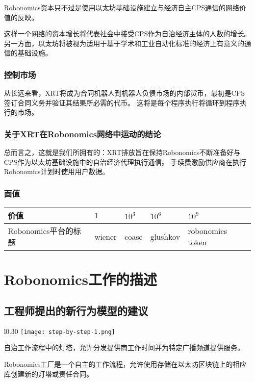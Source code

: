 \documentclass[UTF8]{article}
\begin{document}
Robonomics资本只不过是使用以太坊基础设施建立与经济自主CPS通信的网络价值的反映。
 
这样一个网络的资本增长将代表社会中接受CPS作为自治经济主体的人数的增长。 另一方面，以太坊将被视为适用于基于学术和工业自动化标准的经济上有意义的通信的基础设施。

\subsubsection{控制市场}

从长远来看，XRT将成为合同机器人到机器人负债市场的内部货币，最初是CPS签订合同义务并验证其结果所必需的代币。 这将是每个程序执行将循环到程序执行的市场。

\subsubsection{关于XRT在Robonomics网络中运动的结论}

总而言之，这就是我们所拥有的：XRT排放旨在保持Robonomics不断准备好与CPS作为以太坊基础设施中的自治经济代理执行通信。 手续费激励供应商在执行Robonomics计划时使用用户数据。

\subsubsection{面值}
\begin{tabular}{ l |l |l |l |l}
 价值 &  $1$ & $10^3$ & $10^6$  & $10^9$ \\ 
 \hline
 Robonomics平台的标题 &  wiener & coase  & glushkov & robonomics token\\ 
\end{tabular}

\section{Robonomics工作的描述}
\subsection{工程师提出的新行为模型的建议}

\begin{wrapfigure}{l}{0.30\textwidth} %
    \centering
    \texttt{[image: step-by-step-1.png]}
\end{wrapfigure}

自治工作流程中的灯塔，允许分发提供商工作时间并为特定广播频道提供服务。

Robonomics工厂是一个自主的工作流程，允许使用存储在以太坊区块链上的相应库创建新的灯塔或责任合同。
\end{document}
